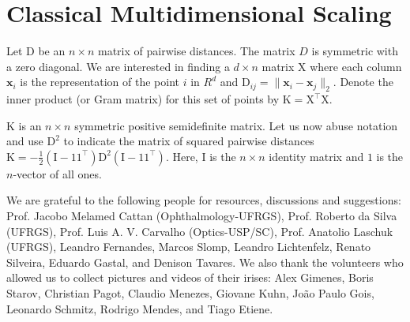 \documentclass{acmtog}
\begin{document}
\appendix

\section{Classical Multidimensional Scaling}
\label{sec:cmds}

Let $\mathrm{D}$ be an $n\times n$  matrix of pairwise distances.
The matrix $D$ is symmetric with a zero diagonal. We are interested in finding a $d \times n$ matrix $\mathrm{X}$ where
each column $\bm{x}_{i}$ is the representation of the point $i$ in $R^{d}$ and $\mathrm{D}_{ij} =
\|\bm{x}_{i}-\bm{x}_{j}\|_{2}$.  Denote the inner product (or Gram matrix) for this set of points by $\mathrm{K} =
\mathrm{X}^{\top}\mathrm{X}$. 




$\mathrm{K}$ is an $n\times n$  symmetric positive semidefinite matrix. Let us now abuse notation and use
$\mathrm{D}^{2}$ to indicate the matrix of squared pairwise distances $\mathrm{K} = -\frac{1}{2}(\mathrm{I} -
\mathrm{1}\mathrm{1}^{\top})\mathrm{D}^{2}(\mathrm{I} - \mathrm{1}\mathrm{1}^{\top})$. Here, $\mathrm{I}$ is the $n \times
n$ identity matrix and $\mathrm{1}$ is the $n$-vector of all ones.



\begin{acks}
We are grateful to the following people for resources, discussions and suggestions: Prof. Jacobo Melamed Cattan
(Ophthalmology-UFRGS), Prof. Roberto da Silva (UFRGS), Prof. Luis A. V. Carvalho (Optics-USP/SC), Prof. Anatolio Laschuk
(UFRGS), Leandro Fernandes, Marcos Slomp,\vadjust{\vfill\pagebreak} Leandro Lichtenfelz, Renato Silveira, Eduardo Gastal, and Denison Tavares. We
also thank the volunteers who allowed us to collect pictures and videos of their irises: Alex Gimenes, Boris Starov,
Christian Pagot, Claudio Menezes, Giovane Kuhn, Jo\~{a}o Paulo Gois, Leonardo Schmitz, Rodrigo Mendes, and Tiago Etiene. 
\end{acks}





\end{document}
